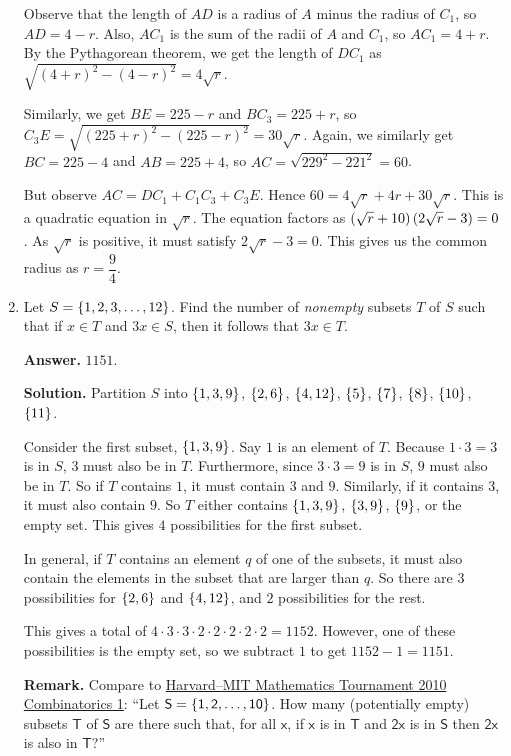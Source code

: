 \documentclass[11pt,paper=letter]{scrartcl}
\begin{document}
\begin{enumerate}[left=0pt]
Observe that the length of $AD$ is a radius of $A$ minus the radius of $C_1$, so $AD = 4 - r$. Also, $AC_1$ is the sum of the radii of $A$ and $C_1$, so $AC_1 = 4 + r$. By the Pythagorean theorem, we get the length of $DC_1$ as $\sqrt{(4+r)^2 - (4-r)^2} = 4\sqrt{r}$.

Similarly, we get $BE = 225 - r$ and $BC_3 = 225 + r$, so $C_3E = \sqrt{(225+r)^2 - (225-r)^2} = 30\sqrt{r}$. Again, we similarly get $BC = 225 - 4$ and $AB = 225 + 4$, so $AC = \sqrt{229^2 - 221^2} = 60$.

But observe $AC = DC_1 + C_1C_3 + C_3E$. Hence $60 = 4\sqrt{r} + 4r + 30\sqrt{r}$. This is a quadratic equation in $\sqrt{r}$. The equation factors as $\left( \sqrt{r} + 10 \right)\left( 2\sqrt{r} - 3 \right) = 0$. As $\sqrt{r}$ is positive, it must satisfy $2\sqrt{r} - 3 = 0$. This gives us the common radius as $r = \dfrac94$.

\item Let $S = \left\{ 1, 2, 3, \ldots, 12 \right\}$. Find the number of \emph{nonempty} subsets $T$ of $S$ such that if $x \in T$ and $3x \in S$, then it follows that $3x \in T$.

{\sffamily \bfseries Answer.} $\boxed{1151}$.

{\sffamily \bfseries Solution.} Partition $S$ into $\left\{ 1, 3, 9 \right\}$, $\left\{ 2, 6 \right\}$, $\left\{ 4, 12 \right\}$, $\left\{ 5 \right\}$, $\left\{ 7 \right\}$, $\left\{ 8 \right\}$, $\left\{ 10 \right\}$, $\left\{ 11 \right\}$. 

Consider the first subset, $\left\{ 1, 3, 9 \right\}$. Say $1$ is an element of $T$. Because $1 \cdot 3 = 3$ is in $S$, $3$ must also be in $T$. Furthermore, since $3 \cdot 3 = 9$ is in $S$, $9$ must also be in $T$. So if $T$ contains $1$, it must contain $3$ and $9$. Similarly, if it contains $3$, it must also contain $9$. So $T$ either contains $\left\{ 1, 3, 9 \right\}$, $\left\{ 3, 9 \right\}$, $\left\{ 9 \right\}$, or the empty set. This gives $4$ possibilities for the first subset.

In general, if $T$ contains an element $q$ of one of the subsets, it must also contain the elements in the subset that are larger than $q$. So there are $3$ possibilities for $\left\{ 2, 6 \right\}$ and $\left\{ 4, 12 \right\}$, and $2$ possibilities for the rest.

This gives a total of $4 \cdot 3 \cdot 3 \cdot 2 \cdot 2 \cdot 2 \cdot 2 \cdot 2 = 1152$. However, one of these possibilities is the empty set, so we subtract $1$ to get $1152 - 1 = 1151$.

{\small \sffamily \textbf{Remark.} Compare to \href{https://www.hmmt.co/static/archive/february/problems/2010/pcomb10f.pdf}{Harvard--MIT Mathematics Tournament 2010 Combinatorics 1}: ``Let $\mathsf{S = \left\{ 1, 2, \ldots, 10 \right\}}$. How many (potentially empty) subsets $\mathsf{T}$ of $\mathsf{S}$ are there such that, for all $\mathsf{x}$, if $\mathsf{x}$ is in $\mathsf{T}$ and $\mathsf{2x}$ is in $\mathsf{S}$ then $\mathsf{2x}$ is also in $\mathsf{T}$?''}
 

\end{enumerate}
\end{document}
